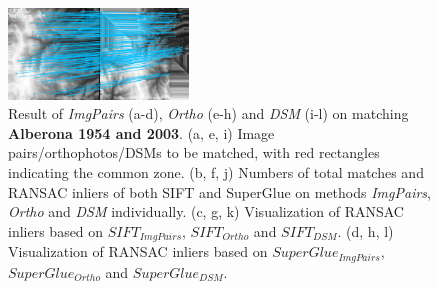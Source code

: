 \begin{figure}[htbp]
\begin{center}
{\begin{minipage}[t]{0.48\linewidth}
				\centering
				\includegraphics[width=4.8cm]{images/Chapitre3/Homol-SIFT2Step-Rough-2DRANSAC_MEC-Malt_Tapas_1954_MEC-Malt_Tapas_2003.png}
			\end{minipage}%
		}
		\caption{{\scriptsize Result of \textit{ImgPairs} (a-d), \textit{Ortho} (e-h) and \textit{DSM} (i-l) on matching \textbf{Alberona 1954 and 2003}. (a, e, i) Image pairs/orthophotos/DSMs to be matched, with red rectangles indicating the common zone. (b, f, j) Numbers of total matches and RANSAC inliers of both SIFT and SuperGlue on methods \textit{ImgPairs}, \textit{Ortho} and \textit{DSM} individually. (c, g, k) Visualization of RANSAC inliers based on $SIFT_{ImgPairs}$, $SIFT_{Ortho}$ and $SIFT_{DSM}$. (d, h, l) Visualization of RANSAC inliers based on $SuperGlue_{ImgPairs}$, $SuperGlue_{Ortho}$ and $SuperGlue_{DSM}$.}}
		\label{MatchVizAlberona1954DSM}
	\end{center}
\end{figure} 



